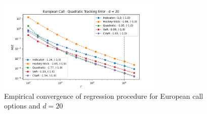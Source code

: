 \begin{figure}[ht]
    \centering
    \includegraphics[width=0.7\textwidth]{./project1/figures/figure3.png}
    \caption{Empirical convergence of regression procedure for European call options and $d=20$}
\label{fig1:reg_lb} 
\end{figure}

